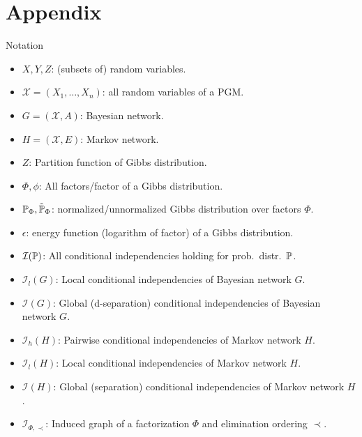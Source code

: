 \section{Appendix}

\begin{frame}{Notation}
\begin{itemize}
\item $X,Y,Z$: (subsets of) random variables.
\item $\mathcal{X} = (X_1,\ldots,X_n)$: all random variables of a PGM.
\item $G = (\mathcal{X},A)$: Bayesian network.
\item $H = (\mathcal{X},E)$: Markov network.
\item $Z$: Partition function of Gibbs distribution.
\item $\Phi,\phi$: All factors/factor of a Gibbs distribution.
\item $\Pb_{\Phi}, \tilde{\Pb}_{\Phi}$: normalized/unnormalized Gibbs distribution over factors $\Phi$.
\item $\epsilon$: energy function (logarithm of factor) of a Gibbs distribution.
\item $\mathcal{I}(\Pb)$: All conditional independencies holding for prob.\ distr.\ $\Pb$.
\item $\mathcal{I}_l(G)$: Local conditional independencies of Bayesian network $G$.
\item $\mathcal{I}(G)$: Global (d-separation) conditional independencies of Bayesian network $G$.
\item $\mathcal{I}_h(H)$: Pairwise conditional independencies of Markov network $H$.
\item $\mathcal{I}_l(H)$: Local conditional independencies of Markov network $H$.
\item $\mathcal{I}(H)$: Global (separation) conditional independencies of Markov network $H$.
\item $\mathcal{I}_{\Phi,\prec}$: Induced graph of a factorization $\Phi$ and elimination ordering $\prec$.
\end{itemize}
\end{frame}

